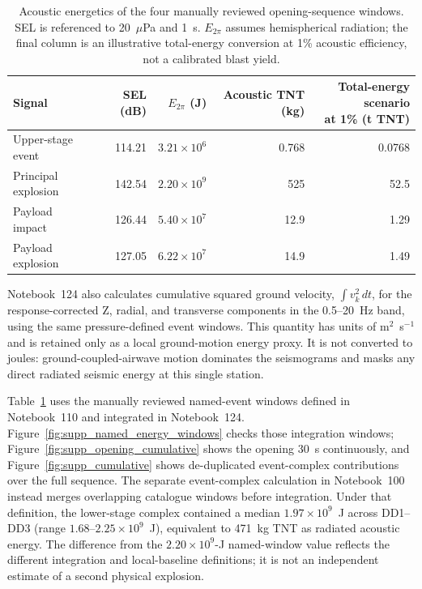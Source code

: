 \documentclass[]{seismica}
\begin{document}
\begin{table}[!tbp]
\centering
\small
\caption{Acoustic energetics of the four manually reviewed opening-sequence
windows. SEL is referenced to 20~$\mu$Pa and 1~s. $E_{2\pi}$ assumes
hemispherical radiation; the final column is an illustrative total-energy
conversion at 1\% acoustic efficiency, not a calibrated blast yield.}
\label{tab:supp_energetics}
\begin{tabularx}{\textwidth}{Xrrrr}
\hline
Signal & SEL (dB) & $E_{2\pi}$ (J) & Acoustic TNT (kg) &
\shortstack{Total-energy scenario\\at 1\% (t TNT)} \\
\hline
Upper-stage event       & 114.21 & $3.21\times10^6$ & 0.768 & 0.0768 \\
Principal explosion     & 142.54 & $2.20\times10^9$ & 525   & 52.5 \\
Payload impact & 126.44 & $5.40\times10^7$ & 12.9  & 1.29 \\
Payload explosion & 127.05 & $6.22\times10^7$ & 14.9  & 1.49 \\
\hline
\end{tabularx}
\end{table}

Notebook~124 also calculates cumulative squared ground velocity,
$\int v_k^2\,dt$, for the response-corrected Z, radial, and transverse
components in the 0.5--20~Hz band, using the same pressure-defined event
windows. This quantity has units of m$^2$~s$^{-1}$ and is retained only as a
local ground-motion energy proxy. It is not converted to joules:
ground-coupled-airwave motion dominates the seismograms and masks any direct
radiated seismic energy at this single station.

Table~\ref{tab:supp_energetics} uses the manually reviewed named-event windows
defined in Notebook~110 and integrated in Notebook~124.
Figure~\ref{fig:supp_named_energy_windows} checks those integration windows;
Figure~\ref{fig:supp_opening_cumulative} shows the opening 30~s continuously,
and Figure~\ref{fig:supp_cumulative} shows de-duplicated event-complex
contributions over the full sequence. The separate
event-complex calculation in Notebook~100 instead merges overlapping catalogue
windows before integration. Under that definition, the lower-stage complex
contained a median $1.97\times10^9$~J across DD1--DD3 (range
$1.68$--$2.25\times10^9$~J), equivalent to 471~kg TNT as radiated acoustic
energy. The difference from the $2.20\times10^9$-J named-window value reflects
the different integration and local-baseline definitions; it is not an
independent estimate of a second physical explosion.
\end{document}
